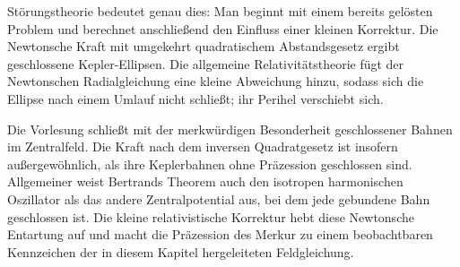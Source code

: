 Störungstheorie bedeutet genau dies: Man beginnt mit einem bereits gelösten Problem und berechnet anschließend den Einfluss einer kleinen Korrektur. Die Newtonsche Kraft mit umgekehrt quadratischem Abstandsgesetz ergibt geschlossene Kepler-Ellipsen. Die allgemeine Relativitätstheorie fügt der Newtonschen Radialgleichung eine kleine Abweichung hinzu, sodass sich die Ellipse nach einem Umlauf nicht schließt; ihr Perihel verschiebt sich.

Die Vorlesung schließt mit der merkwürdigen Besonderheit geschlossener Bahnen im Zentralfeld. Die Kraft nach dem inversen Quadratgesetz ist insofern außergewöhnlich, als ihre Keplerbahnen ohne Präzession geschlossen sind. Allgemeiner weist Bertrands Theorem auch den isotropen harmonischen Oszillator als das andere Zentralpotential aus, bei dem jede gebundene Bahn geschlossen ist. Die kleine relativistische Korrektur hebt diese Newtonsche Entartung auf und macht die Präzession des Merkur zu einem beobachtbaren Kennzeichen der in diesem Kapitel hergeleiteten Feldgleichung.